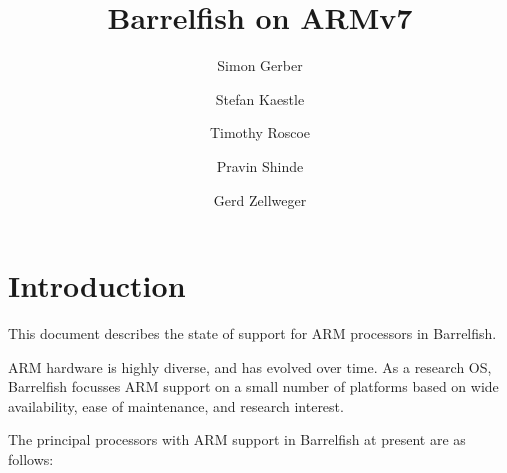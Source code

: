\documentclass[a4paper,twoside]{report} %
\title{Barrelfish on ARMv7}   %
\author{Simon Gerber \and Stefan Kaestle \and Timothy Roscoe \and
  Pravin Shinde \and Gerd Zellweger}
\begin{document}
\maketitle

\newcommand{\code}[1]{{\lstinline!#1!}}
\newcommand{\file}[1]{{\lstinline!#1!}}

\lstset{%
  basicstyle=\small\ttfamily,
  escapechar=@
}

\newcommand{\shell}{\$}
\newcommand{\home}{\$HOME}

\newcommand{\stefan}[1]{%
  {\color{red}[{\color{red}{SK}} #1]}}

\newcommand{\gerd}[1]{%
  {\color{red}[{\color{red}{GZ}} #1]}}

\newcommand{\simon}[1]{%
  {\color{red}[{\color{red}{SG}} #1]}}

\newcommand{\pravin}[1]{%
  {\color{red}[{\color{red}{PS}} #1]}}


%
%
\begin{versionhistory}
\end{versionhistory}

\tableofcontents		%


\newcommand{\eclipse}{ECL\textsuperscript{i}PS\textsuperscript{e}\xspace}
\newcommand{\codesize}{\scriptsize}
\newcommand{\note}[1]{[\textcolor{red}{\emph{#1}}]}

\chapter{Introduction}

This document describes the state of support for ARM processors
in Barrelfish.

ARM hardware is highly diverse, and has evolved over time.  As a
research OS, Barrelfish focusses ARM support on a small number of
platforms based on wide availability, ease of maintenance, and
research interest.  

The principal processors with ARM support in Barrelfish at present are
as follows: 
\end{document}
